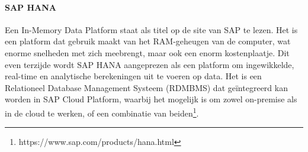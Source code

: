     \paragraph{SAP HANA}
    Een In-Memory Data Platform staat als titel op de site van SAP te lezen. Het is een platform dat gebruik maakt van het RAM-geheugen van de computer, wat enorme snelheden met zich meebrengt, maar ook een enorm kostenplaatje. Dit even terzijde wordt SAP HANA aangeprezen als een platform om ingewikkelde, real-time en analytische berekeningen uit te voeren op data.
    Het is een Relationeel Database Management Systeem (RDMBMS) dat geïntegreerd kan worden in SAP Cloud Platform, waarbij het mogelijk is om zowel on-premise als in de cloud te werken, of een combinatie van beiden\footnote{https://www.sap.com/products/hana.html}.
